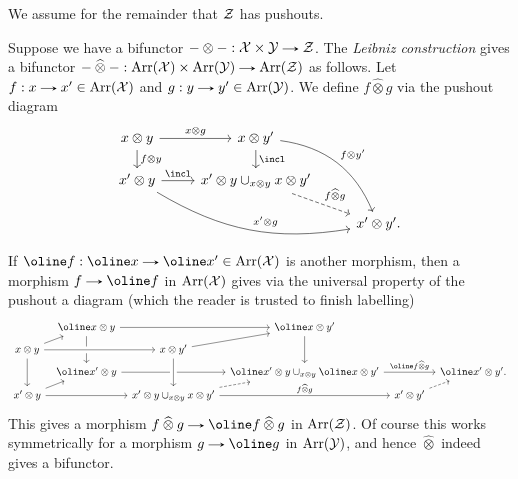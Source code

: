 \begin{situation}
  We assume for the remainder that $\mathcal{Z}$ has pushouts.
\end{situation}

\newcommand{\leib}{\mathbin{\widehat\otimes}}

\begin{definition}
  Suppose we have a bifunctor $- \otimes - : \X \times \Y \to \Z$. The
  \emph{Leibniz construction} gives a bifunctor $- \leib - : \Arr(\X)
  \times \Arr(\Y) \to \Arr(\Z)$ as follows. Let $f : x \to x' \in
  \Arr(\X)$ and $g : y \to y' \in \Arr(\Y)$. We define $f \leib g$ via
  the pushout diagram
  \[
  \begin{tikzcd}[row sep = scriptsize]
    x \otimes y \rar{x \otimes g} \dar{f \otimes y} & x \otimes y'
    \ar[bend left]{ddr}{f \otimes y'} \dar{\incl} \\ x' \otimes y
    \ar[bend right = 20]{rrd}{x' \otimes g} \rar{\incl} & x' \otimes y
    \cup_{x \otimes y} x \otimes y' \ar[dashed]{dr}{f \leib g}\\ & &
    x' \otimes y'.
  \end{tikzcd}
  \]
  If $\oline f : \oline x \to \oline x' \in \Arr(\X)$ is another
  morphism, then a morphism $f \to \oline f$ in $\operatorname{Arr}(\mathcal{X})$ gives via
  the universal property of the pushout a diagram (which the reader is
  trusted to finish labelling)
  \[
  \begin{tikzcd}[row sep = tiny, column sep = tiny]
    \ & \oline x \otimes y \ar{rr} \ar{dd} & & \oline x \otimes y'
    \ar{dd} \\ x \otimes y \ar[crossing over]{rr} \ar{dd} \ar{ur} & &
    x \otimes y' \ar{ur} & \\ \ & \oline x' \otimes y \ar{rr} & &
    \oline x' \otimes y \cup_{x \otimes y} \oline x \otimes y'
    \ar{rr}{\oline f \leib g} & & \oline x' \otimes y'. \\ x' \otimes
    y \ar{rr} \ar{ur} & & x' \otimes y \cup_{x \otimes y} x \otimes y'
    \ar[crossing over, leftarrow]{uu} \ar[dashed]{ur} \ar{rr}{f \leib
      g} & & x' \otimes y' \ar[dashed]{ur}
  \end{tikzcd}
  \]
  This gives a morphism $f \leib g \to \oline f \leib g$ in
  $\operatorname{Arr}(\mathcal{Z})$. Of course this works symmetrically for a morphism $g \to
  \oline g$ in $\operatorname{Arr}(\mathcal{Y})$, and hence $\leib$ indeed gives a bifunctor.
\end{definition}

\begin{lemma}
  
\end{lemma}






